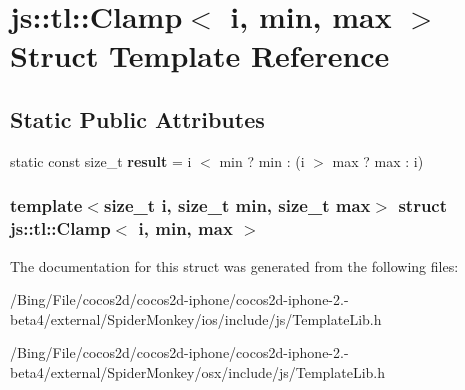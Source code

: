 \hypertarget{structjs_1_1tl_1_1_clamp}{\section{js\-:\-:tl\-:\-:Clamp$<$ i, min, max $>$ Struct Template Reference}
\label{structjs_1_1tl_1_1_clamp}
}
\subsection*{Static Public Attributes}
\begin{DoxyCompactItemize}
\item 
\hypertarget{structjs_1_1tl_1_1_clamp_a87dc5326a3a8b7f593b78bb92895f913}{static const size\-\_\-t {\bfseries result} = i $<$ min ? min \-: (i $>$ max ? max \-: i)}\label{structjs_1_1tl_1_1_clamp_a87dc5326a3a8b7f593b78bb92895f913}

\end{DoxyCompactItemize}
\subsubsection*{template$<$size\-\_\-t i, size\-\_\-t min, size\-\_\-t max$>$ struct js\-::tl\-::\-Clamp$<$ i, min, max $>$}



The documentation for this struct was generated from the following files\-:\begin{DoxyCompactItemize}
\item 
/\-Bing/\-File/cocos2d/cocos2d-\/iphone/cocos2d-\/iphone-\/2.-\/beta4/external/\-Spider\-Monkey/ios/include/js/Template\-Lib.\-h\item 
/\-Bing/\-File/cocos2d/cocos2d-\/iphone/cocos2d-\/iphone-\/2.-\/beta4/external/\-Spider\-Monkey/osx/include/js/Template\-Lib.\-h\end{DoxyCompactItemize}
